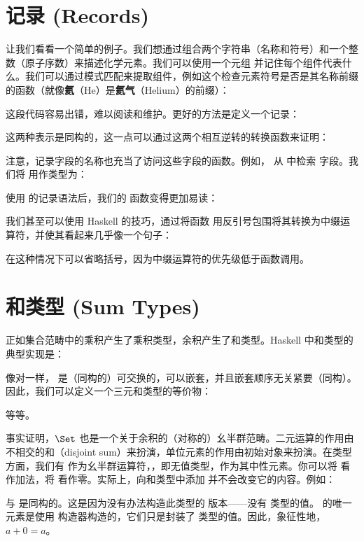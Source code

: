 \section{记录 (Records)}

让我们看看一个简单的例子。我们想通过组合两个字符串（名称和符号）和一个整数（原子序数）来描述化学元素。我们可以使用一个元组  并记住每个组件代表什么。我们可以通过模式匹配来提取组件，例如这个检查元素符号是否是其名称前缀的函数（就像\textbf{氦}（He）是\textbf{氦气}（Helium）的前缀）：

这段代码容易出错，难以阅读和维护。更好的方法是定义一个记录：

这两种表示是同构的，这一点可以通过这两个相互逆转的转换函数来证明：


注意，记录字段的名称也充当了访问这些字段的函数。例如， 从  中检索  字段。我们将  用作类型为：

使用  的记录语法后，我们的  函数变得更加易读：

我们甚至可以使用 Haskell 的技巧，通过将函数  用反引号包围将其转换为中缀运算符，并使其看起来几乎像一个句子：

在这种情况下可以省略括号，因为中缀运算符的优先级低于函数调用。

\section{和类型 (Sum Types)}

正如集合范畴中的乘积产生了乘积类型，余积产生了和类型。Haskell 中和类型的典型实现是：

像对一样， 是（同构的）可交换的，可以嵌套，并且嵌套顺序无关紧要（同构）。因此，我们可以定义一个三元和类型的等价物：

等等。

事实证明，$\Set$ 也是一个关于余积的（对称的）幺半群范畴。二元运算的作用由不相交的和（disjoint sum）来扮演，单位元素的作用由初始对象来扮演。在类型方面，我们有  作为幺半群运算符，，即无值类型，作为其中性元素。你可以将  看作加法，将  看作零。实际上，向和类型中添加  并不会改变它的内容。例如：

与  是同构的。这是因为没有办法构造此类型的  版本——没有  类型的值。 的唯一元素是使用  构造器构造的，它们只是封装了  类型的值。因此，象征性地，$a + 0 = a$。

